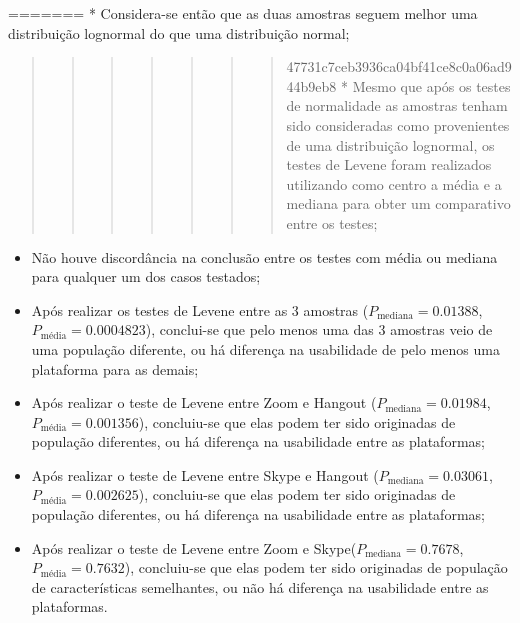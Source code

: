 \documentclass[
]{article}
\begin{document}
======= * Considera-se então que as duas amostras seguem melhor uma
distribuição lognormal do que uma distribuição normal;

\begin{quote}
\begin{quote}
\begin{quote}
\begin{quote}
\begin{quote}
\begin{quote}
\begin{quote}
47731c7ceb3936ca04bf41ce8c0a06ad944b9eb8 * Mesmo que após os testes de
normalidade as amostras tenham sido consideradas como provenientes de
uma distribuição lognormal, os testes de Levene foram realizados
utilizando como centro a média e a mediana para obter um comparativo
entre os testes;
\end{quote}
\end{quote}
\end{quote}
\end{quote}
\end{quote}
\end{quote}
\end{quote}

\begin{itemize}
\item
  Não houve discordância na conclusão entre os testes com média ou
  mediana para qualquer um dos casos testados;
\item
  Após realizar os testes de Levene entre as 3 amostras
  (\(P_{\text{mediana}}= 0.01388\), \(P_{\text{média}}= 0.0004823\)),
  conclui-se que pelo menos uma das 3 amostras veio de uma população
  diferente, ou há diferença na usabilidade de pelo menos uma plataforma
  para as demais;
\item
  Após realizar o teste de Levene entre Zoom e Hangout
  (\(P_{\text{mediana}}= 0.01984\), \(P_{\text{média}}= 0.001356\)),
  concluiu-se que elas podem ter sido originadas de população
  diferentes, ou há diferença na usabilidade entre as plataformas;
\item
  Após realizar o teste de Levene entre Skype e Hangout
  (\(P_{\text{mediana}}= 0.03061\), \(P_{\text{média}}= 0.002625\)),
  concluiu-se que elas podem ter sido originadas de população
  diferentes, ou há diferença na usabilidade entre as plataformas;
\item
  Após realizar o teste de Levene entre Zoom e
  Skype(\(P_{\text{mediana}}= 0.7678\), \(P_{\text{média}}= 0.7632\)),
  concluiu-se que elas podem ter sido originadas de população de
  características semelhantes, ou não há diferença na usabilidade entre
  as plataformas.
\end{itemize}
\end{document}
